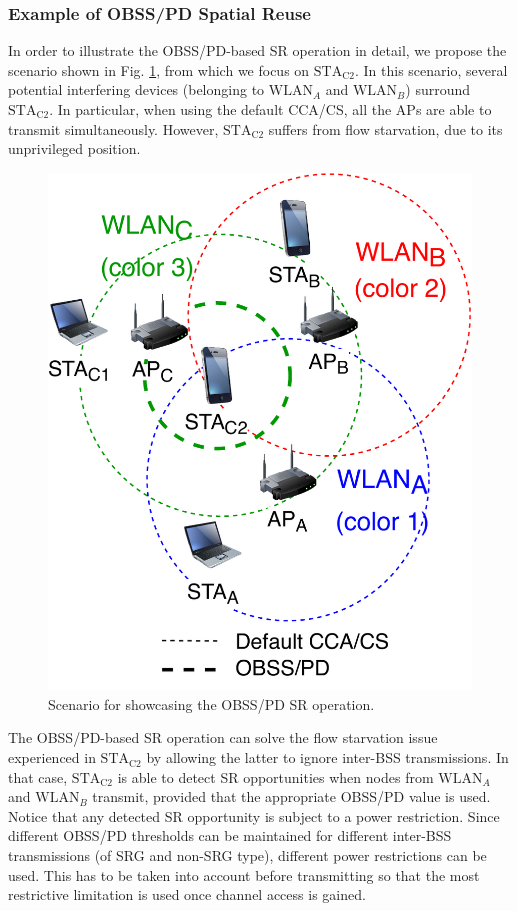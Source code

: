\documentclass[comsoc]{IEEEtran}
\begin{document}
	\subsubsection{Example of OBSS/PD Spatial Reuse}
	In order to illustrate the OBSS/PD-based SR operation in detail, we propose the scenario shown in Fig. \ref{fig:fig_8_a}, from which we focus on $\text{STA}_\text{C2}$. In this scenario, several potential interfering devices (belonging to $\text{WLAN}_A$ and $\text{WLAN}_B$) surround $\text{STA}_\text{C2}$. In particular, when using the default CCA/CS, all the APs are able to transmit simultaneously. However, $\text{STA}_\text{C2}$ suffers from flow starvation, due to its unprivileged position. 
	\begin{figure}[ht!]
		\centering
		\includegraphics[width=0.6\columnwidth]{fig_11}
		\caption{Scenario for showcasing the OBSS/PD SR operation.}
		\label{fig:fig_8_a}
	\end{figure}
	
	The OBSS/PD-based SR operation can solve the flow starvation issue experienced in $\text{STA}_\text{C2}$ by allowing the latter to ignore inter-BSS transmissions. In that case, $\text{STA}_\text{C2}$ is able to detect SR opportunities when nodes from $\text{WLAN}_A$ and $\text{WLAN}_B$ transmit, provided that the appropriate OBSS/PD value is used. Notice that any detected SR opportunity is subject to a power restriction. Since different OBSS/PD thresholds can be maintained for different inter-BSS transmissions (of SRG and non-SRG type), different power restrictions can be used. This has to be taken into account before transmitting so that the most restrictive limitation is used once channel access is gained.
	
\end{document}
